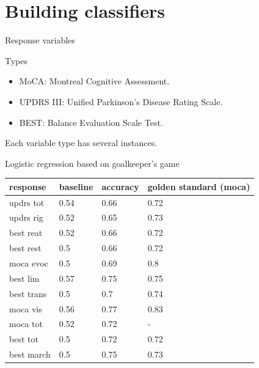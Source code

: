 \documentclass[10pt]{beamer}
\begin{document}
\section{Building classifiers}

\begin{frame}{Response variables}
 \begin{exampleblock}{Types}
  \begin{itemize}
	 \item MoCA: Montreal Cognitive Assessment.
	 \item UPDRS III: Unified Parkinson's Disease Rating Scale.
	 \item BEST: Balance Evaluation Scale Test.
	\end{itemize}
 \end{exampleblock}
 Each variable type has several instances.
\end{frame}

\begin{frame}{Logistic regression based on goalkeeper's game}
 \begin{table}
  \begin{tabular}{l|lll}
	 \hline
	 response    & baseline & accuracy & golden standard (moca) \\
	 \hline
	 updrs tot   & 0.54     & 0.66 & 0.72 \\
	 updrs rig   & 0.52     & 0.65 & 0.73 \\
	 best reat   & 0.52     & 0.66 & 0.72 \\
	 best rest   & 0.5      & 0.66 & 0.72 \\
	 moca evoc   & 0.5      & 0.69 & 0.8  \\
	 best lim    & 0.57     & 0.75 & 0.75 \\
	 best trans  & 0.5      & 0.7  & 0.74 \\
	 moca vis    & 0.56     & 0.77 & 0.83 \\
	 moca tot    & 0.52     & 0.72 & -    \\
	 best tot    & 0.5      & 0.72 & 0.72 \\
	 best march  & 0.5      & 0.75 & 0.73 \\
	 \hline
	\end{tabular}
 \end{table}
\end{frame}

\begin{frame}[allowframebreaks]{}


\end{frame}

\appendix
\end{document}
